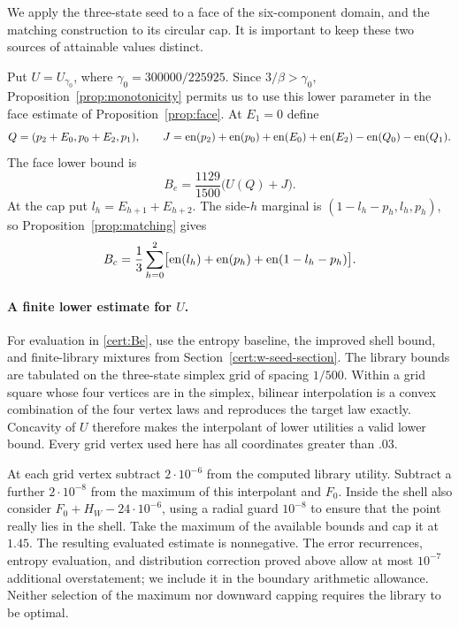 We apply the three-state seed to a face of the six-component domain, and
the matching construction to its circular cap.  It is important to keep
these two sources of attainable values distinct.

Put $U=U_{\gamma_0}$, where $\gamma_0=300000/225925$.  Since
$3/\beta>\gamma_0$, Proposition~\ref{prop:monotonicity} permits us to use
this lower parameter in the face estimate of Proposition~\ref{prop:face}.
At $E_1=0$ define
\begin{equation}\label{cert:face-data}
 Q=(p_2+E_0,p_0+E_2,p_1),\qquad
 J=\operatorname{en}(p_2)+\operatorname{en}(p_0)+\operatorname{en}(E_0)+\operatorname{en}(E_2)-\operatorname{en}(Q_0)-\operatorname{en}(Q_1).
\end{equation}
The face lower bound is
\begin{equation}\label{cert:Be}
 B_e=\frac{1129}{1500}\bigl(U(Q)+J\bigr).
\end{equation}
At the cap put $l_h=E_{h+1}+E_{h+2}$.  The side-$h$ marginal is
$(1-l_h-p_h,l_h,p_h)$, so Proposition~\ref{prop:matching} gives
\begin{equation}\label{cert:Bc}
 B_c=\frac13\sum_{h=0}^2
       \bigl[\operatorname{en}(l_h)+\operatorname{en}(p_h)+\operatorname{en}(1-l_h-p_h)\bigr].
\end{equation}

\paragraph{A finite lower estimate for $U$.}
For evaluation in \eqref{cert:Be}, use the entropy baseline, the improved
shell bound, and finite-library mixtures from
Section~\ref{cert:w-seed-section}.
The library bounds are tabulated on the three-state simplex grid of spacing
$1/500$.  Within a grid square whose four vertices are in the simplex,
bilinear interpolation is a convex combination of the four vertex laws
and reproduces the target law exactly.  Concavity of $U$ therefore makes
the interpolant of lower utilities a valid lower bound.  Every grid vertex
used here has all coordinates greater than $.03$.

At each grid vertex subtract $2\cdot10^{-6}$ from the computed library
utility.  Subtract a further $2\cdot10^{-8}$ from the maximum of this
interpolant and $F_0$.  Inside the shell also consider
$F_0+H_W-24\cdot10^{-6}$, using a radial guard $10^{-8}$ to ensure that the
point really lies in the shell.  Take the maximum of the available bounds
and cap it at $1.45$.  The resulting evaluated estimate is nonnegative.
The error recurrences, entropy evaluation, and distribution correction
proved above allow at most $10^{-7}$ additional overstatement; we include
it in the boundary arithmetic allowance.  Neither selection of the maximum
nor downward capping requires the library to be optimal.

